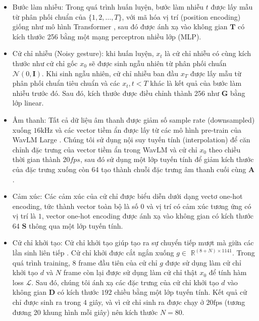 \begin{itemize}
  \item Bước làm nhiễu: Trong quá trình huấn luyện, bước làm nhiễu $t$ được lấy mẫu từ phân phối chuẩn của $\{1,2, \ldots, T\}$, với mã hóa vị trí (position encoding) giống như mô hình Transformer \cite{vaswani2017attention}, sau đó được ánh xạ vào không gian $\mathbf{T}$ có kích thước 256 bằng một mạng perceptron nhiều lớp (MLP).

  \item Cử chỉ nhiễu (Noisy gesture): khi huấn luyện, $x_{t}$ là cử chỉ nhiễu có cùng kích thước như cử chỉ gốc $x_{0}$ sẽ được sinh ngẫu nhiên từ phân phối chuẩn $\mathcal{N}(0, \mathbf{I})$. Khi sinh ngẫu nhiên, cử chỉ nhiễu ban đầu $x_{T}$ được lấy mẫu từ phân phối chuẩn tiêu chuẩn và các $x_{t}, t<T$ khác là kết quả của bước làm nhiễu trước đó. Sau đó, kích thước được điều chỉnh thành 256 như $\mathbf{G}$ bằng lớp linear.

  \item Âm thanh: Tất cả dữ liệu âm thanh được giảm số sample rate (downsampled) xuống $16 \mathrm{kHz}$ và các vector tiềm ẩn được lấy từ các mô hình pre-train của WavLM Large \cite{chen2022wavlm}. Chúng tôi sử dụng nội suy tuyến tính (interpolation) để căn chỉnh đặc trưng của vector tiềm ẩn trong WavLM và cử chỉ $x_{0}$ theo chiều thời gian thành $20fps$, sau đó sử dụng một lớp tuyến tính để giảm kích thước của đặc trưng xuống còn 64 tạo thành chuỗi đặc trưng âm thanh cuối cùng $\mathbf{A}$.

  \item Cảm xúc: Các cảm xúc của cử chỉ được biểu diễn dưới dạng vectơ one-hot encoding, tức thành vector toàn bộ là số $0$ và vị trí có cảm xúc tương ứng có vị trí là $1$, vector one-hot encoding được ánh xạ vào không gian có kích thước 64 $\mathbf{S}$ thông qua một lớp tuyến tính.

  \item Cử chỉ khởi tạo: Cử chỉ khởi tạo giúp tạo ra sự chuyển tiếp mượt mà giữa các lần sinh liên tiếp \cite{yoon2020speech}. Cử chỉ khởi được cắt ngắn xuống $g \in$ $\mathbb{R}^{(8+N) \times 1141}$. Trong quá trình training, $8$ frame đầu tiên của cử chỉ $g$ được sử dụng làm cử chỉ khởi tạo $d$ và $N$ frame còn lại được sử dụng làm cử chỉ thật $x_{0}$ để tính hàm loss $\mathcal{L}$. Sau đó, chúng tôi ánh xạ các đặc trưng của cử chỉ khởi tạo $d$ vào không gian $\mathbf{D}$ có kích thước $192$ chiều bằng một lớp tuyến tính. 
  Kết quả cử chỉ được sinh ra trong $4$ giây, và vì cử chỉ sinh ra được chạy ở $20 \mathrm{fps}$ (tương đương 20 khung hình mỗi giây) nên kích thước $N=80$.

\end{itemize}

